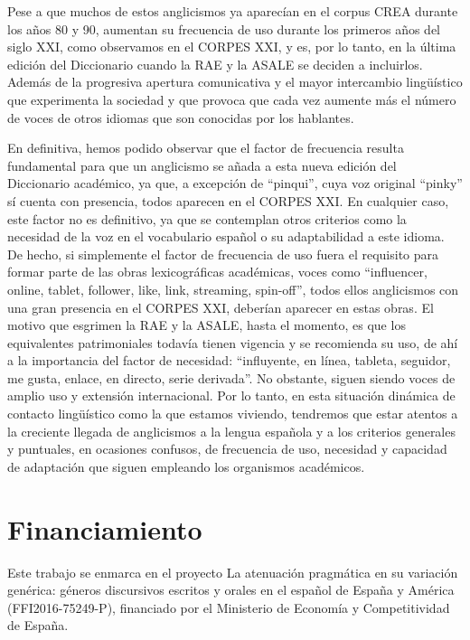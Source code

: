 \documentclass{textolivre}
\begin{document}
Pese a que muchos de estos anglicismos ya aparecían en el corpus CREA durante los años 80 y 90, aumentan su frecuencia de uso durante los primeros años del siglo XXI, como observamos en el CORPES XXI, y es, por lo tanto, en la última edición del Diccionario \cite{real2014diccionario} cuando la RAE y la ASALE se deciden a incluirlos. Además de la progresiva apertura comunicativa y el mayor intercambio lingüístico que experimenta la sociedad y que provoca que cada vez aumente más el número de voces de otros idiomas que son conocidas por los hablantes.

En definitiva, hemos podido observar que el factor de frecuencia resulta fundamental para que un anglicismo se añada a esta nueva edición del Diccionario académico, ya que, a excepción de “pinqui”, cuya voz original “pinky” sí cuenta con presencia, todos aparecen en el CORPES XXI. En cualquier caso, este factor no es definitivo, ya que se contemplan otros criterios como la necesidad de la voz en el vocabulario español o su adaptabilidad a este idioma. De hecho, si simplemente el factor de frecuencia de uso fuera el requisito para formar parte de las obras lexicográficas académicas, voces como “influencer, online, tablet, follower, like, link, streaming, spin-off”, todos ellos anglicismos con una gran presencia en el CORPES XXI, deberían aparecer en estas obras. El motivo que esgrimen la RAE y la ASALE, hasta el momento, es que los equivalentes patrimoniales todavía tienen vigencia y se recomienda su uso, de ahí a la importancia del factor de necesidad: “influyente, en línea, tableta, seguidor, me gusta, enlace, en directo, serie derivada”. No obstante, siguen siendo voces de amplio uso y extensión internacional. Por lo tanto, en esta situación dinámica de contacto lingüístico como la que estamos viviendo, tendremos que estar atentos a la creciente llegada de anglicismos a la lengua española y a los criterios generales y puntuales, en ocasiones confusos, de frecuencia de uso, necesidad y capacidad de adaptación que siguen empleando los organismos académicos.



\section*{Financiamiento}
Este trabajo se enmarca en el proyecto La atenuación pragmática en su variación genérica: géneros discursivos escritos y orales en el español de España y América (FFI2016-75249-P), financiado por el Ministerio de Economía y Competitividad de España.




\printbibliography\label{sec-bib}
\end{document}

